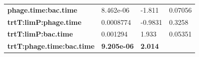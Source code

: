 \documentclass[]{article}
\begin{document}
\begin{longtable}[]{@{}llll@{}}
\begin{minipage}[t]{0.43\columnwidth}
\textbf{phage.time:bac.time}\strut
\end{minipage} & \begin{minipage}[t]{0.17\columnwidth}\raggedright\strut
8.462e-06\strut
\end{minipage} & \begin{minipage}[t]{0.13\columnwidth}\raggedright\strut
-1.811\strut
\end{minipage} & \begin{minipage}[t]{0.16\columnwidth}\raggedright\strut
0.07056\strut
\end{minipage}\tabularnewline
\begin{minipage}[t]{0.43\columnwidth}\raggedright\strut
\textbf{trtT:limP:phage.time}\strut
\end{minipage} & \begin{minipage}[t]{0.17\columnwidth}\raggedright\strut
0.0008774\strut
\end{minipage} & \begin{minipage}[t]{0.13\columnwidth}\raggedright\strut
-0.9831\strut
\end{minipage} & \begin{minipage}[t]{0.16\columnwidth}\raggedright\strut
0.3258\strut
\end{minipage}\tabularnewline
\begin{minipage}[t]{0.43\columnwidth}\raggedright\strut
\textbf{trtT:limP:bac.time}\strut
\end{minipage} & \begin{minipage}[t]{0.17\columnwidth}\raggedright\strut
0.001294\strut
\end{minipage} & \begin{minipage}[t]{0.13\columnwidth}\raggedright\strut
1.933\strut
\end{minipage} & \begin{minipage}[t]{0.16\columnwidth}\raggedright\strut
0.05351\strut
\end{minipage}\tabularnewline
\begin{minipage}[t]{0.43\columnwidth}\raggedright\strut
\textbf{trtT:phage.time:bac.time}\strut
\end{minipage} & \begin{minipage}[t]{0.17\columnwidth}\raggedright\strut
\textbf{9.205e-06}\strut
\end{minipage} & \begin{minipage}[t]{0.13\columnwidth}\raggedright\strut
\textbf{2.014}\strut
\end{minipage} & \begin{minipage}[t]{0.16\columnwidth}\raggedright\strut

\end{minipage}
\end{longtable}
\end{document}
